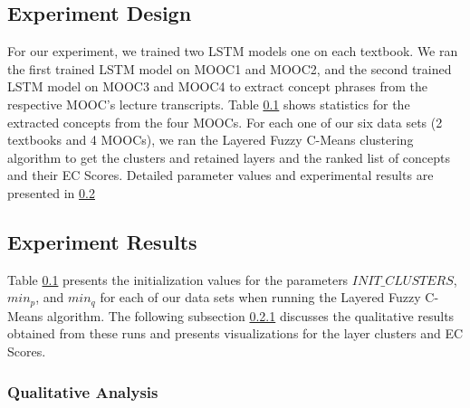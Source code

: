 
\subsection{Experiment Design}
For our experiment, we trained two LSTM models one on each textbook. We ran the first trained LSTM model on MOOC1 and MOOC2, and the second trained LSTM model on MOOC3 and MOOC4 to extract concept phrases from the respective MOOC's lecture transcripts. Table \ref{} shows statistics for the extracted concepts from the four MOOCs.
For each one of our six data sets (2 textbooks and 4 MOOCs), we ran the Layered Fuzzy C-Means clustering algorithm to get the clusters and retained layers and the ranked list of concepts and their EC Scores. Detailed parameter values and experimental results are presented in \ref{exp_results}

\subsection{Experiment Results}\label{exp_results}
Table \ref{} presents the initialization values for the parameters $INIT\_CLUSTERS$, $min_p$, and $min_q$ for each of our data sets when running the Layered Fuzzy C-Means algorithm. The following subsection \ref{qualitative} discusses the qualitative results obtained from these runs and presents visualizations for the layer clusters and EC Scores.

\subsubsection{Qualitative Analysis}\label{qualitative}

